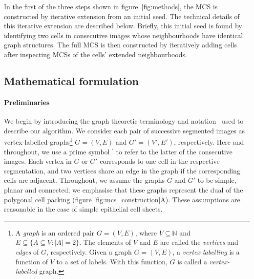 \documentclass[a4paper,11pt]{article}
\begin{document}

In the first of the three steps shown in figure~\ref{fig:methods}, the MCS is constructed by iterative extension from an initial seed. 
The technical details of this iterative extension are described below.
Briefly, this initial seed is found by identifying two cells in consecutive images whose neighbourhoods have identical graph structures.
The full MCS is then constructed by iteratively adding cells after inspecting MCSs of the cells' extended neighbourhoods. 


\subsection{Mathematical formulation}
\label{sec:mathematical_formulation}

\paragraph{Preliminaries}

We begin by introducing the graph theoretic terminology and notation~\cite{Wilson2010} used to describe our algorithm. 
We consider each pair of successive segmented images as vertex-labelled graphs\footnote{A \textit{graph} is an ordered pair $G = (V, E)$, where $V \subseteq \mathbb{N}$ and $E \subseteq \{ A \subseteq V : |A| = 2 \}$. 
The elements of $V$ and $E$ are called the \textit{vertices} and \textit{edges} of $G$, respectively. Given a graph $G = (V,E)$, a \textit{vertex labelling} is a function of $V$ to a set of labels. With this function, $G$ is called a \textit{vertex-labelled} graph.} $G = (V, E)$ and $G' = (V', E')$, respectively. 
Here and throughout, we use a prime symbol $^\prime$ to refer to the latter of the consecutive images.
Each vertex in $G$ or $G'$ corresponds to one cell in the respective segmentation, and two vertices share an edge in the graph if the corresponding cells are adjacent.
Throughout, we assume the graphs $G$ and $G'$ to be simple, planar and connected; we emphasise that these graphs represent the dual of the polygonal cell packing (figure \ref{fig:mcs_construction}A).
%
%
%
%
%
%
These assumptions are reasonable in the case of simple epithelial cell sheets.
\end{document}
